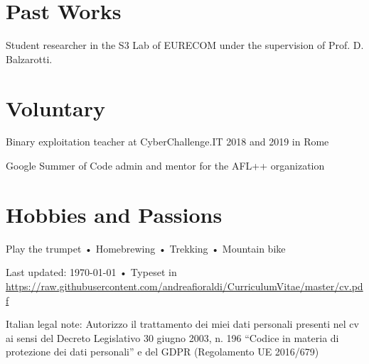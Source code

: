 \documentclass[10pt, a4paper]{article}
\newcommand{\years}[1]{\marginnote{\scriptsize #1}}
\begin{document}
\section*{Past Works}

\noindent
\years{2020} Student researcher in the S3 Lab of EURECOM under the supervision of Prof. D. Balzarotti.

\section*{Voluntary}
\noindent
\years{2018}Binary exploitation teacher at CyberChallenge.IT 2018 and 2019 in Rome

\years{2020}Google Summer of Code admin and mentor for the AFL++ organization

\section*{Hobbies and Passions}
Play the trumpet • Homebrewing • Trekking • Mountain bike

\vfill{}

\begin{center}
{\scriptsize  Last updated: \today\- •\- 
Typeset in \href{http://nitens.org/taraborelli/cvtex}{
\XeTeX }\\
\href{https://raw.githubusercontent.com/andreafioraldi/CurriculumVitae/master/cv.pdf}{https://raw.githubusercontent.com/andreafioraldi/CurriculumVitae/master/cv.pdf}}
\end{center}

{\scriptsize Italian legal note: Autorizzo il trattamento dei miei dati personali presenti nel cv ai sensi del Decreto Legislativo 30 giugno 2003, n. 196 “Codice in materia di protezione dei dati personali” e del GDPR (Regolamento UE 2016/679)}
\end{document}
